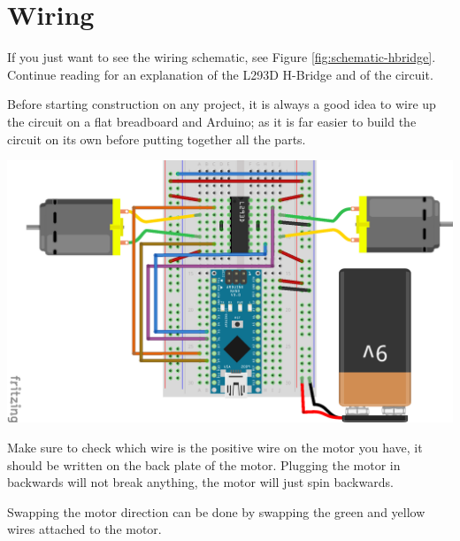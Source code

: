\documentclass[../TinyBot.tex]{subfiles}
\begin{document}
\section{Wiring} \label{wiring}
If you just want to see the wiring schematic, see Figure \ref{fig:schematic-hbridge}. Continue reading for an explanation of the L293D H-Bridge and of the circuit. 

\bigskip

Before starting construction on any project, it is always a good idea to wire up the circuit on a flat breadboard and Arduino; as it is far easier to build the circuit on its own before putting together all the parts. \\




\begin{center}
    \includegraphics[width=\textwidth]{resources/H-bridge-nano_bb.png}
    \label{fig:schematic-hbridge}
\end{center}

Make sure to check which wire is the positive wire on the motor you have, it should be written on the back plate of the motor. Plugging the motor in backwards will not break anything, the motor will just spin backwards. 

Swapping the motor direction can be done by swapping the green and yellow wires attached to the motor. 
\end{document}
